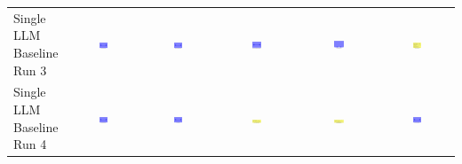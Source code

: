 \begin{table}
\begin{tabular}{@{}lccccc@{}}
    \makecell{Single LLM \\ Baseline \\ Run 3} & \includegraphics[width=0.13\textwidth]{./run_3/png/gpt-4o_results/MicrofluidicChip.png} & \includegraphics[width=0.13\textwidth]{./run_3/png/o1-preview_results/MicrofluidicChip.png} & \includegraphics[width=0.13\textwidth]{./run_3/png/claude-3-5-sonnet-20240620_results/MicrofluidicChip.png} & \includegraphics[width=0.13\textwidth]{./run_3/png/watsonx_meta-llama_llama-3-1-70b-instruct_results/MicrofluidicChip.png} & \includegraphics[width=0.13\textwidth]{./run_3/png/watsonx_meta-llama_llama-3-405b-instruct_results/MicrofluidicChip.png} \\
    \makecell{Single LLM \\ Baseline \\ Run 4} & \includegraphics[width=0.13\textwidth]{./run_4/png/gpt-4o_results/MicrofluidicChip.png} & \includegraphics[width=0.13\textwidth]{./run_4/png/o1-preview_results/MicrofluidicChip.png} & \includegraphics[width=0.13\textwidth]{./run_4/png/claude-3-5-sonnet-20240620_results/MicrofluidicChip.png} & \includegraphics[width=0.13\textwidth]{./run_4/png/watsonx_meta-llama_llama-3-1-70b-instruct_results/MicrofluidicChip.png} & \includegraphics[width=0.13\textwidth]{./run_4/png/watsonx_meta-llama_llama-3-405b-instruct_results/MicrofluidicChip.png} \\

\end{tabular}
\end{table}
